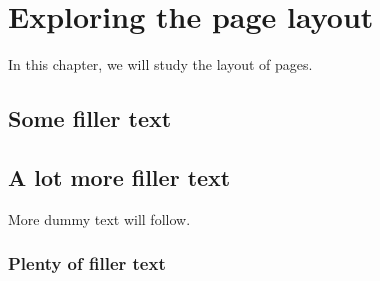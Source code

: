 \documentclass[a4paper,12pt]{book}
\begin{document}
	\chapter{Exploring the page layout}
	In this chapter, we will study the layout of pages.
	\section{Some filler text}
	\blindtext
	\section{A lot more filler text}
	More dummy text will follow.
	\subsection{Plenty of filler text}
	\blindtext[10]
	
\end{document}
